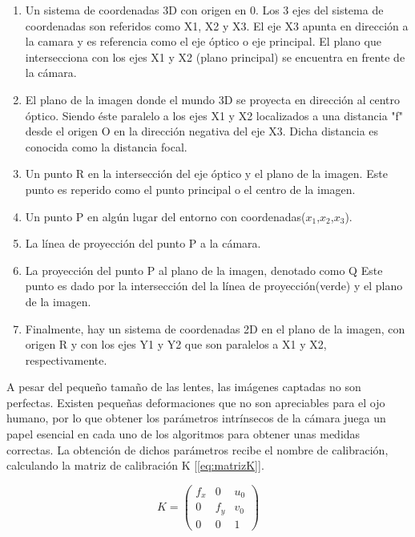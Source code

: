 \documentclass{bmvc2k}
\begin{document}
\begin{enumerate}
	\item Un sistema de coordenadas 3D con origen en 0. Los 3 ejes del sistema de coordenadas son referidos como X1, X2 y X3. El eje X3 apunta en dirección a la camara y es referencia como el eje óptico o eje principal. El plano que intersecciona con los ejes X1 y X2 (plano principal) se encuentra en frente de la cámara.
	
	\item El plano de la imagen donde el mundo 3D se proyecta en dirección al centro óptico. Siendo éste paralelo a los ejes X1 y X2 localizados a una distancia "f" desde el origen O en la dirección negativa del eje X3. Dicha distancia es conocida como la distancia focal.
	
	\item Un punto R en la intersección del eje óptico y el plano de la imagen. Este punto es reperido como el punto principal o el centro de la imagen.

	\item Un punto P en algún lugar del entorno con coordenadas($x_{1}$,$x_{2}$,$x_{3}$).
	
	\item La línea de proyección del punto P a la cámara.
	
	\item La proyección del punto P al plano de la imagen, denotado como Q Este punto es dado por la intersección del la línea de proyección(verde) y el plano de la imagen.
	
	\item Finalmente, hay un sistema de coordenadas 2D en el plano de la imagen, con origen R y con los ejes Y1 y Y2 que son paralelos a X1 y X2, respectivamente.
\end{enumerate}

A pesar del pequeño tamaño de las lentes, las imágenes captadas no son perfectas. Existen pequeñas deformaciones que no son apreciables para el ojo humano, por lo que obtener los parámetros intrínsecos de la cámara juega un papel esencial en cada uno de los algoritmos para obtener unas medidas correctas. La obtención de dichos parámetros recibe el nombre de calibración, calculando la matriz de calibración K [\ref{eq:matrizK}].


\begin{equation}\label{eq:matrizK}
K=
\begin{pmatrix}
f_{x} & 0 & u_{0} \\
0 & f_{y} & v_{0} \\
0 & 0 & 1
\end{pmatrix}
\end{equation}
\end{document}
